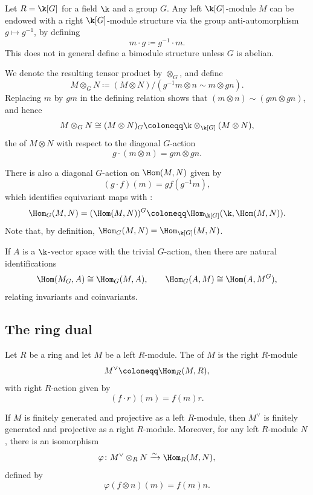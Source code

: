 \begin{example}
Let $R = \k[G]$ for a field $\k$ and a group $G$. Any left $\k[G]$-module $M$ can be endowed with a right $\k[G]$-module structure via the group anti-automorphism $g \mapsto g^{-1}$, by defining
\[
m \cdot g \coloneqq g^{-1} \cdot m.
\]
This does not in general define a bimodule structure unless $G$ is abelian.

We denote the resulting tensor product by $\otimes_G$, and define
\[
M \otimes_G N \coloneqq (M \otimes N) \big/ (g^{-1}m \otimes n \sim m \otimes gn).
\]
Replacing $m$ by $gm$ in the defining relation shows that $(m \otimes n) \sim (gm \otimes gn)$, and hence
\[
M \otimes_G N \cong (M \otimes N)_G \coloneqq \k \otimes_{\k[G]} (M \otimes N),
\]
the  of $M \otimes N$ with respect to the diagonal $G$-action
\[
g \cdot (m \otimes n) = gm \otimes gn.
\]

There is also a diagonal $G$-action on $\Hom(M,N)$ given by
\[
(g \cdot f)(m) = g f(g^{-1} m),
\]
which identifies equivariant maps with :
\[
\Hom_G(M,N) = (\Hom(M,N))^G \coloneqq \Hom_{\k[G]}(\k, \Hom(M,N)).
\]
Note that, by definition, $\Hom_G(M,N) = \Hom_{\k[G]}(M,N)$.

If $A$ is a $\k$-vector space with the trivial $G$-action, then there are natural identifications
\[
\Hom(M_G, A) \cong \Hom_G(M,A),
\qquad
\Hom_G(A,M) \cong \Hom(A, M^G),
\]
relating invariants and coinvariants.
\end{example}

\subsection{The ring dual}

Let $R$ be a ring and let $M$ be a left $R$-module. The  of $M$ is the right $R$-module
\[
M^\vee \coloneqq \Hom_R(M,R),
\]
with right $R$-action given by
\[
(f \cdot r)(m) = f(m) r.
\]

If $M$ is finitely generated and projective as a left $R$-module, then $M^\vee$ is finitely generated and projective as a right $R$-module. Moreover, for any left $R$-module $N$, there is an isomorphism
\[
\varphi \colon M^\vee \otimes_R N \xrightarrow{\sim} \Hom_R(M,N),
\]
defined by
\[
\varphi(f \otimes n)(m) = f(m) n.
\]


